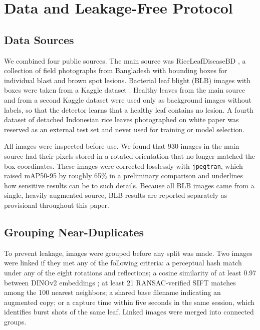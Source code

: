\documentclass[conference]{IEEEtran}
\begin{document}
\section{Data and Leakage-Free Protocol}

\subsection{Data Sources}
We combined four public sources. The main source was RiceLeafDiseaseBD \cite{ds4}, a collection of field photographs from Bangladesh with bounding boxes for individual blast and brown spot lesions. Bacterial leaf blight (BLB) images with boxes were taken from a Kaggle dataset \cite{ds1}. Healthy leaves from the main source and from a second Kaggle dataset \cite{ds2} were used only as background images without labels, so that the detector learns that a healthy leaf contains no lesion. A fourth dataset of detached Indonesian rice leaves photographed on white paper \cite{ds3} was reserved as an external test set and never used for training or model selection.

All images were inspected before use. We found that 930 images in the main source had their pixels stored in a rotated orientation that no longer matched the box coordinates. These images were corrected losslessly with \texttt{jpegtran}, which raised mAP50-95 by roughly 65\% in a preliminary comparison and underlines how sensitive results can be to such details. Because all BLB images came from a single, heavily augmented source, BLB results are reported separately as provisional throughout this paper.

\subsection{Grouping Near-Duplicates}
To prevent leakage, images were grouped before any split was made. Two images were linked if they met any of the following criteria: a perceptual hash match under any of the eight rotations and reflections; a cosine similarity of at least 0.97 between DINOv2 embeddings \cite{oquab2024}; at least 21 RANSAC-verified SIFT matches \cite{lowe2004} among the 100 nearest neighbors; a shared base filename indicating an augmented copy; or a capture time within five seconds in the same session, which identifies burst shots of the same leaf. Linked images were merged into connected groups.
\end{document}

